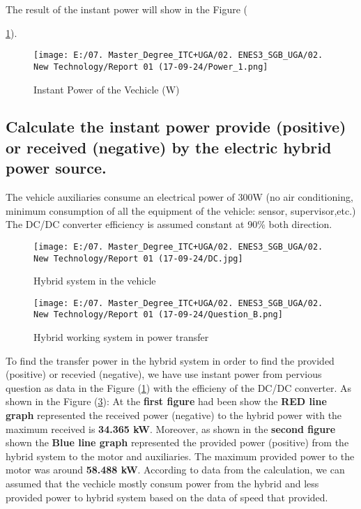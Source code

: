 \documentclass[12pt,a4paper]{article}
\numberwithin{equation}{section}
\begin{document}
	 The result of the instant power will show in the Figure ({\ref{5}).
	 
	 \begin{figure}[h]
	 	\centering 
	 	\texttt{[image: E:/07. Master\_Degree\_ITC+UGA/02. ENES3\_SGB\_UGA/02. New Technology/Report 01 (17-09-24/Power\_1.png]}
	 	\caption{\small {Instant Power of the Vechicle (W)}}
	 	\label{5}
	 \end{figure}
	

	\subsection{Calculate the instant power provide (positive) or received (negative) by the electric hybrid power source. }
	
	The vehicle auxiliaries consume an electrical power of 300W (no air conditioning, minimum consumption of all the equipment of the vehicle: sensor, supervisor,etc.) The DC/DC converter efficiency is assumed constant at 90\% both direction.
	
	\begin{figure}[h]
		\centering 
		\texttt{[image: E:/07. Master\_Degree\_ITC+UGA/02. ENES3\_SGB\_UGA/02. New Technology/Report 01 (17-09-24/DC.jpg]}
		\caption{\small {Hybrid system in the vehicle}}
		\label{6}
	\end{figure}
\newpage
	\begin{figure}[h]
	\centering 
	\texttt{[image: E:/07. Master\_Degree\_ITC+UGA/02. ENES3\_SGB\_UGA/02. New Technology/Report 01 (17-09-24/Question\_B.png]}
	\caption{\small {Hybrid working system in power transfer}}
	\label{7}
	\end{figure}
	To find the transfer power in the hybrid system in order to find the provided (positive) or recevied (negative), we have use instant power from pervious question as data in the Figure (\ref{5}) with the efficieny of the DC/DC converter. As shown in the Figure (\ref{7}): At the \textbf{first figure} had been show the \textbf{RED line graph} represented the received power (negative) to the hybrid power with the maximum received is \textbf{34.365 kW}. Moreover, as shown in the \textbf{second figure} shown the \textbf{Blue line graph} represented the provided power (positive) from the hybrid system to the motor and auxiliaries. The maximum provided power to the motor was around \textbf{58.488 kW}. According to data from the calculation, we can assumed that the vechicle mostly consum power from the hybrid and less provided power to hybrid system based on the data of speed that provided. 
	
}
\end{document}
